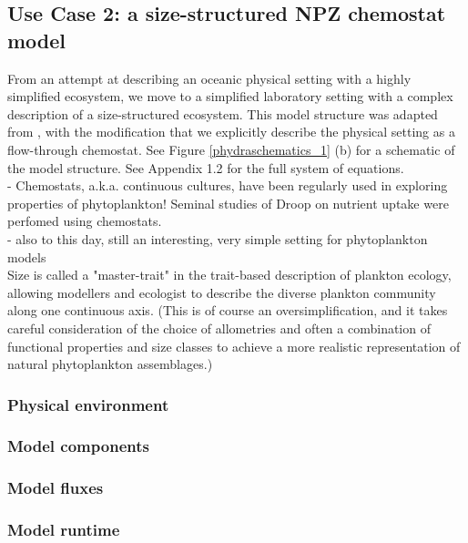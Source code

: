 \documentclass[template.tex]{subfiles}
\begin{document}
\subsection{Use Case 2: a size-structured NPZ chemostat model}

From an attempt at describing an oceanic physical setting with a highly simplified ecosystem, we move to a simplified laboratory setting with a complex description of a size-structured ecosystem. This model structure was adapted from \cite{Banas2011b}, with the modification that we explicitly describe the physical setting as a flow-through chemostat. See Figure \ref{phydraschematics_1} (b) for a schematic of the model structure. See Appendix 1.2 for the full system of equations. \\

- Chemostats, a.k.a. continuous cultures, have been regularly used in exploring properties of phytoplankton! Seminal studies of Droop on nutrient uptake were perfomed using chemostats. \citep{Droop1968VitaminLutheri} \\
- also to this day, still an interesting, very simple setting for phytoplankton models\\

Size is called a "master-trait" in the trait-based description of plankton ecology, allowing modellers and ecologist to describe the diverse plankton community along one continuous axis. (This is of course an oversimplification, and it takes careful consideration of the choice of allometries and often a combination of functional properties and size classes to achieve a more realistic representation of natural phytoplankton assemblages.)

\subsubsection{Physical environment}
\subsubsection{Model components}

\subsubsection{Model fluxes}

\subsubsection{Model runtime}
\end{document}
